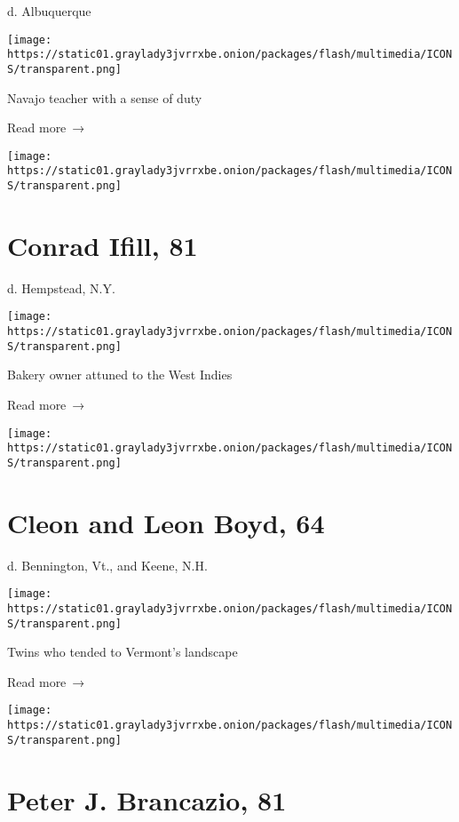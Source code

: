 d. Albuquerque

\texttt{[image: https://static01.graylady3jvrrxbe.onion/packages/flash/multimedia/ICONS/transparent.png]}

Navajo teacher with a sense of duty

 Read more~→

\href{https://www.nytimes3xbfgragh.onion/2020/05/18/obituaries/conrad-ifill-dead-coronavirus.html}{}

\texttt{[image: https://static01.graylady3jvrrxbe.onion/packages/flash/multimedia/ICONS/transparent.png]}

\hypertarget{conrad-ifill-81}{%
\section{Conrad Ifill, 81}\label{conrad-ifill-81}}

d. Hempstead, N.Y.

\texttt{[image: https://static01.graylady3jvrrxbe.onion/packages/flash/multimedia/ICONS/transparent.png]}

Bakery owner attuned to the West Indies

 Read more~→

\href{https://www.nytimes3xbfgragh.onion/2020/05/18/obituaries/cleon-and-leon-boyd-dead-coronavirus.html}{}

\texttt{[image: https://static01.graylady3jvrrxbe.onion/packages/flash/multimedia/ICONS/transparent.png]}

\hypertarget{cleon-and-leon-boyd-64}{%
\section{Cleon and Leon Boyd, 64}\label{cleon-and-leon-boyd-64}}

d. Bennington, Vt., and Keene, N.H.

\texttt{[image: https://static01.graylady3jvrrxbe.onion/packages/flash/multimedia/ICONS/transparent.png]}

Twins who tended to Vermont's landscape

 Read more~→

\href{https://www.nytimes3xbfgragh.onion/2020/05/16/obituaries/peter-brancazio-dead-coronavirus.html}{}

\texttt{[image: https://static01.graylady3jvrrxbe.onion/packages/flash/multimedia/ICONS/transparent.png]}

\hypertarget{peter-j-brancazio-81}{%
\section{Peter J. Brancazio, 81}\label{peter-j-brancazio-81}}

